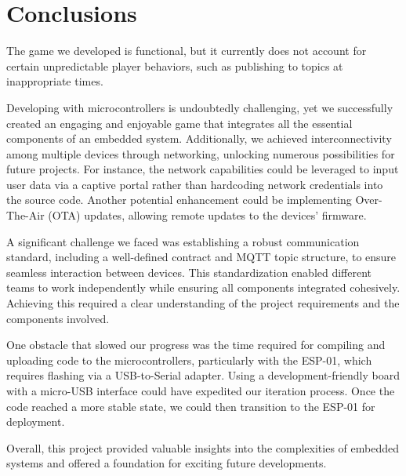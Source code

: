 \documentclass[../main.tex]{subfiles}
\begin{document}
\section{Conclusions}

The game we developed is functional, but it currently does not account for certain unpredictable player behaviors, such as publishing to topics at inappropriate times.

Developing with microcontrollers is undoubtedly challenging, yet we successfully created an engaging and enjoyable game that integrates all the essential components of an embedded system. Additionally, we achieved interconnectivity among multiple devices through networking, unlocking numerous possibilities for future projects. For instance, the network capabilities could be leveraged to input user data via a captive portal rather than hardcoding network credentials into the source code. Another potential enhancement could be implementing Over-The-Air (OTA) updates, allowing remote updates to the devices' firmware.

A significant challenge we faced was establishing a robust communication standard, including a well-defined contract and MQTT topic structure, to ensure seamless interaction between devices. This standardization enabled different teams to work independently while ensuring all components integrated cohesively. Achieving this required a clear understanding of the project requirements and the components involved.

One obstacle that slowed our progress was the time required for compiling and uploading code to the microcontrollers, particularly with the ESP-01, which requires flashing via a USB-to-Serial adapter. Using a development-friendly board with a micro-USB interface could have expedited our iteration process. Once the code reached a more stable state, we could then transition to the ESP-01 for deployment.

Overall, this project provided valuable insights into the complexities of embedded systems and offered a foundation for exciting future developments.
\end{document}
